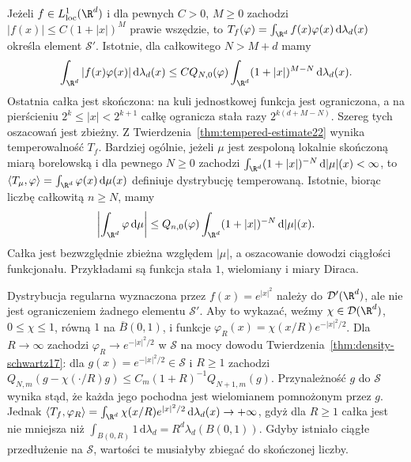 \begin{przyklad}
\label{ex:tempered-regular22}
Jeżeli $f\in L^1_{\mathrm{loc}}(\R^d)$ i
dla pewnych $C>0$, $M\ge0$ zachodzi
$|f(x)|\le C(1+|x|)^M$ prawie wszędzie,
to $T_f(\varphi)=\int_{\R^d}f(x)\varphi(x)\,\mathrm d\lambda_d(x)$
określa element $\mathcal S'$. Istotnie, dla całkowitego $N>M+d$ mamy
\[
 \int_{\R^d}|f(x)\varphi(x)|\,\mathrm d\lambda_d(x)
 \le C Q_{N,0}(\varphi)
 \int_{\R^d}(1+|x|)^{M-N}\,\mathrm d\lambda_d(x).
\]
Ostatnia całka jest skończona: na kuli jednostkowej
funkcja jest ograniczona, a na pierścieniu
$2^k\le |x|<2^{k+1}$ całkę ogranicza stała razy
$2^{k(d+M-N)}$. Szereg tych oszacowań jest zbieżny.
Z Twierdzenia~\ref{thm:tempered-estimate22} wynika
temperowalność $T_f$.
Bardziej ogólnie, jeżeli $\mu$ jest zespoloną lokalnie skończoną
miarą borelowską i dla pewnego $N\ge0$ zachodzi
$\int_{\R^d}(1+|x|)^{-N}\,\mathrm d|\mu|(x)<\infty$,
to $\langle T_\mu,\varphi\rangle=
\int_{\R^d}\varphi(x)\,\mathrm d\mu(x)$
definiuje dystrybucję temperowaną. Istotnie, biorąc
liczbę całkowitą $n\ge N$, mamy
\[
 \left|\int_{\R^d}\varphi\,\mathrm d\mu\right|
 \le Q_{n,0}(\varphi)
 \int_{\R^d}(1+|x|)^{-N}\,\mathrm d|\mu|(x).
\]
Całka jest bezwzględnie zbieżna względem $|\mu|$,
a oszacowanie dowodzi ciągłości funkcjonału.
Przykładami są funkcja stała $1$, wielomiany i miary Diraca.
\end{przyklad}

\begin{przyklad}
\label{ex:non-tempered22}
Dystrybucja regularna wyznaczona przez
$f(x)=e^{|x|^2}$ należy do $\mathcal D'(\R^d)$,
ale nie jest ograniczeniem żadnego elementu $\mathcal S'$.
Aby to wykazać, weźmy $\chi\in\mathcal D(\R^d)$,
$0\le\chi\le1$, równą $1$ na $\overline B(0,1)$,
i funkcje $\varphi_R(x)=\chi(x/R)e^{-|x|^2/2}$.
Dla $R\to\infty$ zachodzi
$\varphi_R\to e^{-|x|^2/2}$ w $\mathcal S$
na mocy dowodu Twierdzenia~\ref{thm:density-schwartz17}:
dla $g(x)=e^{-|x|^2/2}\in\mathcal S$ i $R\ge1$ zachodzi
$Q_{N,m}(g-\chi(\cdot/R)g)\le
C_m(1+R)^{-1}Q_{N+1,m}(g)$.
Przynależność $g$ do $\mathcal S$ wynika stąd, że
każda jego pochodna jest wielomianem pomnożonym przez $g$.
Jednak
$\langle T_f,\varphi_R\rangle
=\int_{\R^d}\chi(x/R)e^{|x|^2/2}\,\mathrm d\lambda_d(x)
\to+\infty$,
gdyż dla $R\ge1$ całka jest nie mniejsza niż
$\int_{B(0,R)}1\,\mathrm d\lambda_d=
R^d\lambda_d(B(0,1))$.
Gdyby istniało ciągłe przedłużenie na $\mathcal S$,
wartości te musiałyby zbiegać do skończonej liczby.
\end{przyklad}

